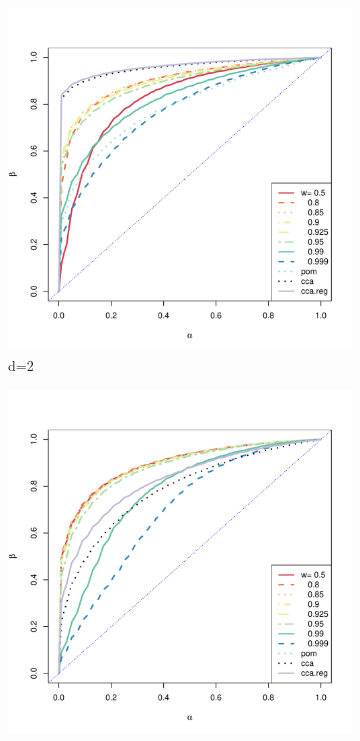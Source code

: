 \documentclass[12pt,oneside,final]{thesis}
\begin{document}
\begin{figure}
 \centering
  \captionsetup[subfigure]{labelformat=empty}
        \begin{subfigure}[b]{0.5\textwidth}        
               \centerline{\includegraphics[width=\textwidth]{ROC-d-2.pdf}}
                \caption{d=2}
                \label{fig:ROC-d-2}
        \end{subfigure}%
        \begin{subfigure}[b]{0.5\textwidth}           
                  \centerline{\includegraphics[width=\textwidth]{ROC-d-5.pdf}}

\end{subfigure}
\end{figure}
\end{document}

